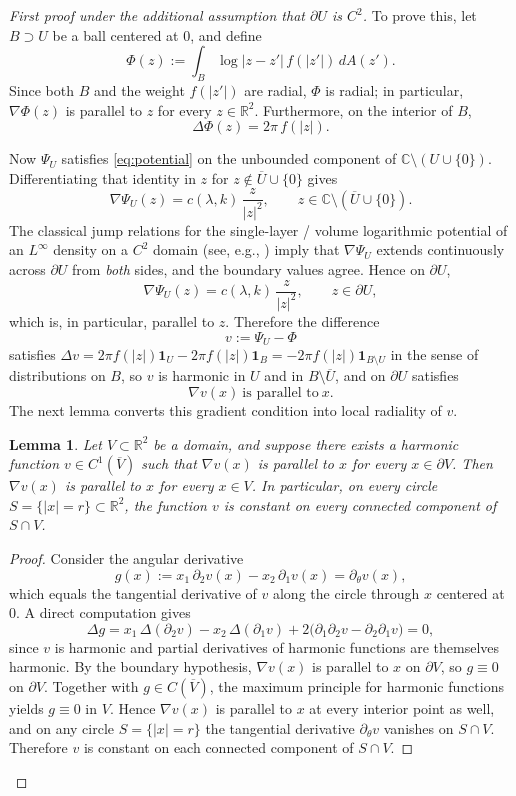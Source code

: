 \documentclass[a4paper,11pt,reqno]{amsart}
\numberwithin{equation}{section}
\theoremstyle{plain} %
\newtheorem{lemma}{Lemma}[section]
\theoremstyle{definition} %
\theoremstyle{remark}
\newcommand{\R}{\mathbb{R}}
\newcommand{\C}{\mathbb{C}}
\begin{document}
\begin{proof}[First proof under the additional assumption that $\partial U$ is $C^2$]
To prove this, let $B\supset U$ be a ball centered at $0$, and define
\[
\Phi(z):=\int_B \log|z-z'|\, f(|z'|)\,dA(z').
\]
Since both $B$ and the weight $f(|z'|)$ are radial, $\Phi$ is radial; in
particular, $\nabla \Phi(z)$ is parallel to $z$ for every $z\in \R^2$.
Furthermore, on the interior of $B$,
\[
\Delta \Phi(z)=2\pi\, f(|z|).
\]

Now $\Psi_U$ satisfies \eqref{eq:potential} on the unbounded
component of $\C\setminus(U\cup\{0\})$. Differentiating that identity
in $z$ for $z\not\in \overline{U}\cup\{0\}$ gives
\[
\nabla \Psi_U(z)=c(\lambda,k)\,\frac{z}{|z|^2},
\qquad z\in \C\setminus(\overline{U}\cup\{0\}).
\]
The classical jump relations for the single-layer / volume logarithmic
potential of an $L^\infty$ density on a $C^2$ domain (see, e.g.,
\cite{Gustafsson}) imply that $\nabla\Psi_U$ extends continuously
across $\partial U$ from \emph{both} sides, and the boundary values
agree. Hence on $\partial U$,
\[
\nabla \Psi_U(z)=c(\lambda,k)\,\frac{z}{|z|^2},
\qquad z\in \partial U,
\]
which is, in particular, parallel to $z$. Therefore the difference
\[
v:=\Psi_U-\Phi
\]
satisfies $\Delta v=2\pi f(|z|)\mathbf 1_U-2\pi f(|z|)\mathbf 1_B
=-2\pi f(|z|)\mathbf 1_{B\setminus U}$ in the sense of distributions
on $B$, so $v$ is harmonic in $U$ and in $B\setminus\overline{U}$, and
on $\partial U$ satisfies
\[
\nabla v(x)\ \text{is parallel to}\ x.
\]
The next lemma converts this gradient condition into local radiality of $v$.

\begin{lemma}\label{lem:harmonic-locally-radial}
Let $V\subset \R^2$ be a domain, and suppose there exists a harmonic
function $v\in C^1(\overline{V})$ such that $\nabla v(x)$ is parallel to
$x$ for every $x\in \partial V$. Then $\nabla v(x)$ is parallel to $x$
for every $x\in V$. In particular, on every circle
$S=\{|x|=r\}\subset \R^2$, the function $v$ is constant on every
connected component of $S\cap V$.
\end{lemma}

\begin{proof}
Consider the angular derivative
\[
g(x):=x_1\,\partial_2 v(x)-x_2\,\partial_1 v(x)
=\partial_\theta v(x),
\]
which equals the tangential derivative of $v$ along the circle
through $x$ centered at $0$. A direct computation gives
\[
\Delta g
=x_1\,\Delta(\partial_2 v)-x_2\,\Delta(\partial_1 v)
+2\big(\partial_1\partial_2 v-\partial_2\partial_1 v\big)
=0,
\]
since $v$ is harmonic and partial derivatives of harmonic functions
are themselves harmonic. By the boundary hypothesis, $\nabla v(x)$ is
parallel to $x$ on $\partial V$, so $g\equiv 0$ on $\partial V$.
Together with $g\in C(\overline{V})$, the maximum principle for
harmonic functions yields $g\equiv 0$ in $V$. Hence $\nabla v(x)$ is
parallel to $x$ at every interior point as well, and on any circle
$S=\{|x|=r\}$ the tangential derivative $\partial_\theta v$ vanishes
on $S\cap V$. Therefore $v$ is constant on each connected component
of $S\cap V$.
\end{proof}


\end{proof}
\end{document}
